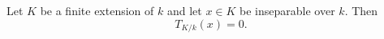 Let $K$ be a finite extension of $k$ and let $x \in K$ be inseparable over $k$. Then
$$T_{K/k}(x) = 0.$$
